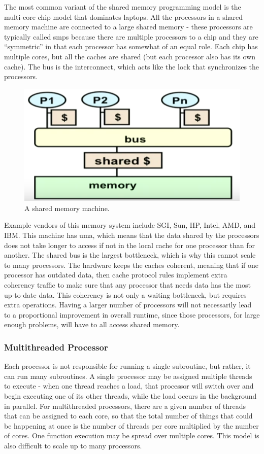\documentclass[10pt]{article}
\begin{document}
\begin{flushleft}
The most common variant of the shared memory programming model is the multi-core chip model that dominates laptops. All the processors in a shared memory machine are connected to a large shared memory - these processors are typically called \gls{smp}s because there are multiple processors to a chip and they are ``symmetric'' in that each processor has somewhat of an equal role. Each chip has multiple cores, but all the caches are shared (but each processor also has its own cache). The bus is the interconnect, which acts like the lock that synchronizes the processors.

\begin{figure}[H]
\centering
\includegraphics[width=0.5\linewidth]{figures/shared-memory.pdf}
\caption{A shared memory machine.}
\end{figure}

Example vendors of this memory system include SGI, Sun, HP, Intel, AMD, and IBM. This machine has \gls{uma}, which means that the data shared by the processors does not take longer to access if not in the local cache for one processor than for another. The shared bus is the largest bottleneck, which is why this cannot scale to many processors. The hardware keeps the caches coherent, meaning that if one processor has outdated data, then cache protocol rules implement extra coherency traffic to make sure that any processor that needs data has the most up-to-date data. This coherency is not only a waiting bottleneck, but requires extra operations. Having a larger number of processors will not necessarily lead to a proportional improvement in overall runtime, since those processors, for large enough problems, will have to all access shared memory.

\subsubsection{Multithreaded Processor}

Each processor is not responsible for running a single subroutine, but rather, it can run many subroutines. A single processor may be assigned multiple threads to execute - when one thread reaches a load, that processor will switch over and begin executing one of its other threads, while the load occurs in the background in parallel. For multithreaded processors, there are a given number of threads that can be assigned to each core, so that the total number of things that could be happening at once is the number of threads per core multiplied by the number of cores. One function execution may be spread over multiple cores. This model is also difficult to scale up to many processors.


\end{flushleft}
\end{document}
